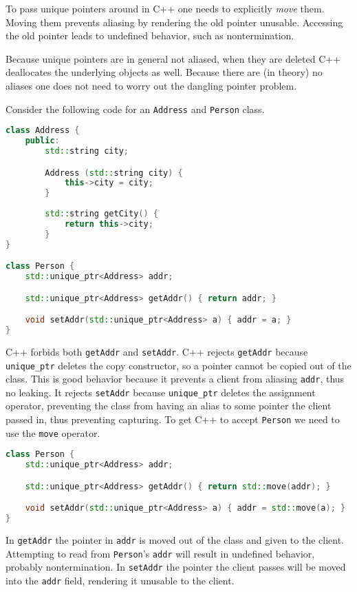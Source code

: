 \documentclass{article}
\begin{document}
To pass unique pointers around in C++ one needs to explicitly \textit{move} them.
Moving them prevents aliasing by rendering the old pointer unusable.
Accessing the old pointer leads to undefined behavior, such as nontermination.

Because unique pointers are in general not aliased, when they are deleted C++ deallocates the underlying objects as well.
Because there are (in theory) no aliases one does not need to worry out the dangling pointer problem.

\begin{example}
  Consider the following code for an \texttt{Address} and \texttt{Person} class.
\begin{lstlisting}[escapechar=|, language=C++]
class Address {
    public:
        std::string city;

        Address (std::string city) {
            this->city = city;
        }
    
        std::string getCity() {
            return this->city;
        }
}

class Person {
    std::unique_ptr<Address> addr;

    std::unique_ptr<Address> getAddr() { return addr; }

    void setAddr(std::unique_ptr<Address> a) { addr = a; } 
}
\end{lstlisting}

  C++ forbids both \texttt{getAddr} and \texttt{setAddr}.
  C++ rejects \texttt{getAddr} because \texttt{unique\_ptr} deletes the copy constructor, so a pointer cannot be copied out of the class.
  This is good behavior because it prevents a client from aliasing \texttt{addr}, thus no leaking.
  It rejects \texttt{setAddr} because \texttt{unique\_ptr} deletes the assignment operator, preventing the class from having an alias to some pointer the client passed in, thus preventing capturing.
  To get C++ to accept \texttt{Person} we need to use the \texttt{move} operator.

\begin{lstlisting}[escapechar=|, language=C++]
class Person {
    std::unique_ptr<Address> addr;

    std::unique_ptr<Address> getAddr() { return std::move(addr); }

    void setAddr(std::unique_ptr<Address> a) { addr = std::move(a); } 
}
\end{lstlisting}
  In \texttt{getAddr} the pointer in \texttt{addr} is moved out of the class and given to the client.
  Attempting to read from \texttt{Person}'s \texttt{addr} will result in undefined behavior, probably nontermination.
  In \texttt{setAddr} the pointer the client passes will be moved into the \texttt{addr} field, rendering it unusable to the client.
\end{example}
\end{document}
